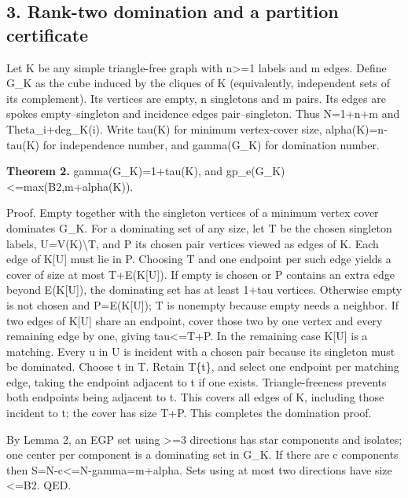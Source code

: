 \documentclass[
]{article}
\begin{document}
\subsection{3. Rank-two domination and a partition
certificate}\label{rank-two-domination-and-a-partition-certificate}

Let K be any simple triangle-free graph with n\textgreater=1 labels and
m edges. Define G\_K as the cube induced by the cliques of K
(equivalently, independent sets of its complement). Its vertices are
empty, n singletons and m pairs. Its edges are spokes empty--singleton
and incidence edges pair--singleton. Thus N=1+n+m and
\textbar Theta\_i+deg\_K(i). Write tau(K) for minimum
vertex-cover size, alpha(K)=n-tau(K) for independence number, and
gamma(G\_K) for domination number.

\textbf{Theorem 2.} gamma(G\_K)=1+tau(K), and
gp\_e(G\_K)\textless=max(B2,m+alpha(K)).

Proof. Empty together with the singleton vertices of a minimum vertex
cover dominates G\_K. For a dominating set of any size, let T be the
chosen singleton labels, U=V(K)\textbackslash{}T, and P its chosen pair vertices viewed
as edges of K. Each edge of K{[}U{]} must lie in P. Choosing T and one
endpoint per such edge yields a cover of size at most
\textbar T\textbar+\textbar E(K{[}U{]})\textbar. If empty is chosen or P
contains an extra edge beyond E(K{[}U{]}), the dominating set has at
least 1+tau vertices. Otherwise empty is not chosen and P=E(K{[}U{]}); T
is nonempty because empty needs a neighbor. If two edges of K{[}U{]}
share an endpoint, cover those two by one vertex and every remaining
edge by one, giving
tau\textless=\textbar T\textbar+\textbar P. In the remaining
case K{[}U{]} is a matching. Every u in U is incident with a chosen pair
because its singleton must be dominated. Choose t in T. Retain T\{t\},
and select one endpoint per matching edge, taking the endpoint adjacent
to t if one exists. Triangle-freeness prevents both endpoints being
adjacent to t. This covers all edges of K, including those incident to
t; the cover has size \textbar T\textbar+\textbar P. This
completes the domination proof.

By Lemma 2, an EGP set using \textgreater=3 directions has star
components and isolates; one center per component is a dominating set in
G\_K. If there are c components then
\textbar S\textbar=N-c\textless=N-gamma=m+alpha. Sets using at most two
directions have size \textless=B2. QED.
\end{document}

